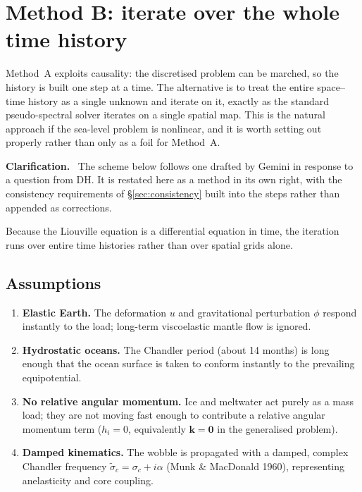 \documentclass[11pt,a4paper]{article}
\newcommand{\bk}{\mathbf{k}}
\renewenvironment{leftbar}{%
  \def\FrameCommand{{\color{clarbar}\vrule width 2.5pt}\hspace{8pt}}%
  \MakeFramed{\advance\hsize-\width\FrameRestore}}%
  {\endMakeFramed}
\newenvironment{clar}{\begin{leftbar}\small\noindent\textbf{Clarification.}\ }{\end{leftbar}}
\begin{document}
\section{Method B: iterate over the whole time history}
\label{sec:methodB}

Method~A exploits causality: the discretised problem can be marched, so the history is built one step
at a time. The alternative is to treat the entire space--time history as a single unknown and iterate
on it, exactly as the standard pseudo-spectral solver iterates on a single spatial map. This is the
natural approach if the sea-level problem is nonlinear, and it is worth setting out properly rather
than only as a foil for Method~A.

\begin{clar}
The scheme below follows one drafted by Gemini in response to a question from DH. It is restated
here as a method in its own right, with the consistency requirements of \S\ref{sec:consistency}
built into the steps rather than appended as corrections.
\end{clar}

Because the Liouville equation is a differential equation in time, the iteration runs over entire
time histories rather than over spatial grids alone.

\subsection{Assumptions}

\begin{enumerate}
  \item \textbf{Elastic Earth.} The deformation $u$ and gravitational perturbation $\phi$ respond
  instantly to the load; long-term viscoelastic mantle flow is ignored.
  \item \textbf{Hydrostatic oceans.} The Chandler period (about 14 months) is long enough that the
  ocean surface is taken to conform instantly to the prevailing equipotential.
  \item \textbf{No relative angular momentum.} Ice and meltwater act purely as a mass load; they are
  not moving fast enough to contribute a relative angular momentum term ($h_i=0$, equivalently
  $\bk=\mathbf{0}$ in the generalised problem).
  \item \textbf{Damped kinematics.} The wobble is propagated with a damped, complex Chandler
  frequency $\tilde\sigma_c=\sigma_c+i\alpha$ (Munk \& MacDonald 1960), representing anelasticity and
  core coupling.
\end{enumerate}
\end{document}
